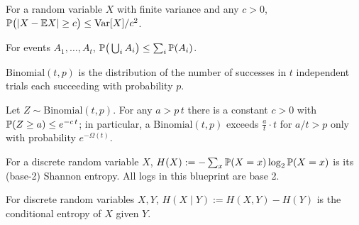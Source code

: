\begin{theorem}
  \label{thm:chebyshev}
  \mathlibok
  For a random variable $X$ with finite variance and any $c>0$,
  $\mathbb{P}\big(|X-\mathbb{E} X| \ge c\big) \le \mathrm{Var}[X]/c^2$.
\end{theorem}

\begin{theorem}
  \label{thm:union-bound}
  \mathlibok
  For events $A_1,\dots,A_t$, $\mathbb{P}\big(\bigcup_i A_i\big) \le \sum_i \mathbb{P}(A_i)$.
\end{theorem}

\begin{definition}
  \label{def:binomial}
  \mathlibok
  $\mathrm{Binomial}(t,p)$ is the distribution of the number of successes in $t$
  independent trials each succeeding with probability $p$.
\end{definition}

\begin{theorem}
  \label{thm:chernoff}
  \mathlibok
  Let $Z \sim \mathrm{Binomial}(t,p)$. For any $a > p\,t$ there is a constant
  $c>0$ with $\mathbb{P}(Z \ge a) \le e^{-c\,t}$; in particular, a $\mathrm{Binomial}(t,p)$
  exceeds $\tfrac{a}{t}\cdot t$ for $a/t > p$ only with probability $e^{-\Omega(t)}$.
\end{theorem}

\begin{definition}[Entropy]
  \label{def:entropy}
  \mathlibok
  For a discrete random variable $X$, $H(X) := -\sum_x \mathbb{P}(X=x)\log_2 \mathbb{P}(X=x)$
  is its (base-2) Shannon entropy. All logs in this blueprint are base 2.
\end{definition}

\begin{definition}
  \label{def:cond-entropy}
  \mathlibok
  For discrete random variables $X,Y$, $H(X\mid Y) := H(X,Y) - H(Y)$ is the
  conditional entropy of $X$ given $Y$.
\end{definition}


